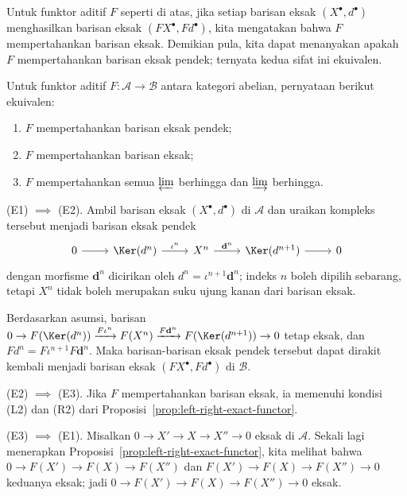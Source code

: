 Untuk funktor aditif $F$ seperti di atas, jika setiap barisan eksak
$(X^\bullet,d^\bullet)$ menghasilkan barisan eksak $(FX^\bullet,Fd^\bullet)$,
kita mengatakan bahwa $F$ mempertahankan barisan eksak. Demikian pula, kita
dapat menanyakan apakah $F$ mempertahankan barisan eksak pendek; ternyata kedua
sifat ini ekuivalen.

\begin{proposisi}\label{prop:exact-functor}
Untuk funktor aditif $F:\mathcal{A}\to\mathcal{B}$ antara kategori abelian,
pernyataan berikut ekuivalen:
\begin{enumerate}[(E1)]
	\item $F$ mempertahankan barisan eksak pendek;
	\item $F$ mempertahankan barisan eksak;
	\item $F$ mempertahankan semua $\varprojlim$ berhingga dan $\varinjlim$ berhingga.
\end{enumerate}
\end{proposisi}

\begin{bukti}
(E1) $\implies$ (E2). Ambil barisan eksak $(X^\bullet,d^\bullet)$ di
$\mathcal{A}$ dan uraikan kompleks tersebut menjadi barisan eksak pendek
\[\begin{tikzcd}
	0 \arrow[r] & \Ker(d^n) \arrow[r, "{\iota^n}"] & X^n \arrow[r, "{\mathbf{d}^n}"] & \Ker(d^{n+1}) \arrow[r] & 0
\end{tikzcd}\]
dengan morfisme $\mathbf{d}^n$ dicirikan oleh
$d^n=\iota^{n+1}\mathbf{d}^n$; indeks $n$ boleh dipilih sebarang, tetapi
$X^n$ tidak boleh merupakan suku ujung kanan dari barisan eksak.

Berdasarkan asumsi, barisan
$0\to F(\Ker(d^n))\xrightarrow{F\iota^n}F(X^n)
\xrightarrow{F\mathbf{d}^n}F(\Ker(d^{n+1}))\to0$ tetap eksak, dan
$Fd^n=F\iota^{n+1}F\mathbf{d}^n$. Maka barisan-barisan eksak pendek tersebut
dapat dirakit kembali menjadi barisan eksak $(FX^\bullet,Fd^\bullet)$ di
$\mathcal{B}$.

(E2) $\implies$ (E3). Jika $F$ mempertahankan barisan eksak, ia memenuhi
kondisi (L2) dan (R2) dari Proposisi~\ref{prop:left-right-exact-functor}.

(E3) $\implies$ (E1). Misalkan
$0\to X'\to X\to X''\to0$ eksak di $\mathcal{A}$. Sekali lagi menerapkan
Proposisi~\ref{prop:left-right-exact-functor}, kita melihat bahwa
$0\to F(X')\to F(X)\to F(X'')$ dan
$F(X')\to F(X)\to F(X'')\to0$ keduanya eksak; jadi
$0\to F(X')\to F(X)\to F(X'')\to0$ eksak.
\end{bukti}

